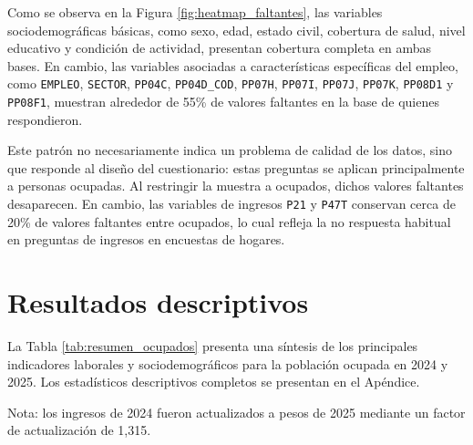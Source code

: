 \documentclass[11pt,a4paper]{article}
\begin{document}
Como se observa en la Figura \ref{fig:heatmap_faltantes}, las variables sociodemográficas básicas, como sexo, edad, estado civil, cobertura de salud, nivel educativo y condición de actividad, presentan cobertura completa en ambas bases. En cambio, las variables asociadas a características específicas del empleo, como \texttt{EMPLEO}, \texttt{SECTOR}, \texttt{PP04C}, \texttt{PP04D\_COD}, \texttt{PP07H}, \texttt{PP07I}, \texttt{PP07J}, \texttt{PP07K}, \texttt{PP08D1} y \texttt{PP08F1}, muestran alrededor de 55\% de valores faltantes en la base de quienes respondieron.

Este patrón no necesariamente indica un problema de calidad de los datos, sino que responde al diseño del cuestionario: estas preguntas se aplican principalmente a personas ocupadas. Al restringir la muestra a ocupados, dichos valores faltantes desaparecen. En cambio, las variables de ingresos \texttt{P21} y \texttt{P47T} conservan cerca de 20\% de valores faltantes entre ocupados, lo cual refleja la no respuesta habitual en preguntas de ingresos en encuestas de hogares.

\section{Resultados descriptivos}

La Tabla \ref{tab:resumen_ocupados} presenta una síntesis de los principales indicadores laborales y sociodemográficos para la población ocupada en 2024 y 2025. Los estadísticos descriptivos completos se presentan en el Apéndice.

\begin{table}[H]
\centering
\caption{Indicadores seleccionados de la población ocupada. EPH 2024T4 y 2025T4}
\label{tab:resumen_ocupados}
\begin{flushleft}
\footnotesize Nota: los ingresos de 2024 fueron actualizados a pesos de 2025 mediante un factor de actualización de 1,315.
\end{flushleft}
\end{table}
\end{document}
